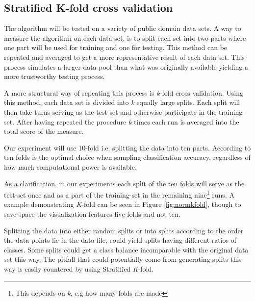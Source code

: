 \documentclass[a4paper,twoside]{bth}
\begin{document}
\subsection{Stratified K-fold cross validation}

The algorithm will be tested on a variety of public domain data sets. A way to measure the algorithm on each data set, is to split each set into two parts where one part will be used for training and one for testing. This method can be repeated and averaged to get a more representative result of each data set. This process simulates a larger data pool than what was originally available yielding a more trustworthy testing process.

\par A more structural way of repeating this process is \textit{k}-fold cross validation. Using this method, each data set is divided into \textit{k} equally large splits. Each split will then take turns serving as the test-set and otherwise participate in the training-set. After having repeated the procedure \textit{k} times each run is averaged into the total score of the measure.

\par Our experiment will use 10-fold i.e. splitting the data into ten parts. According to \cite{Kohavi:1995:SCB:1643031.1643047} ten folds is the optimal choice when sampling classification accuracy, regardless of how much computational power is available.

\par As a clarification, in our experiments each split of the ten folds will serve as the test-set once and as a part of the training-set in the remaining nine\footnote{This depends on \textit{k}, e.g how many folds are made} runs. A example demonstrating \textit{K}-fold can be seen in Figure \ref{fig:normkfold}, though to save space the visualization features five folds and not ten. 

\par Splitting the data into either random splits or into splits according to the order the data points lie in the data-file, could yield splits having different ratios of classes. Some splits could get a class balance incomparable with the original data set this way. The pitfall that could potentially come from generating splits this way is easily countered by using Stratified \textit{K}-fold. 
\end{document}
